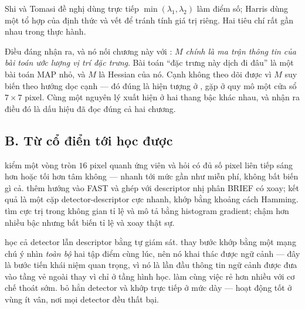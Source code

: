 \documentclass[../../vslam.tex]{subfiles}
\begin{document}
Shi và Tomasi \cite{shi1994good} đề nghị dùng trực tiếp \(\min(\lambda_1,\lambda_2)\) làm điểm số; Harris dùng một tổ hợp của định thức và vết để tránh tính giá trị riêng. Hai tiêu chí rất gần nhau trong thực hành.

Điều đáng nhận ra, và nó nối chương này với : \emph{\(M\) chính là ma trận thông tin của bài toán ước lượng vị trí đặc trưng}. Bài toán ``đặc trưng này dịch đi đâu'' là một bài toán MAP nhỏ, và \(M\) là Hessian của nó. Cạnh không theo dõi được vì \(M\) suy biến theo hướng dọc cạnh --- đó đúng là hiện tượng ở , gặp ở quy mô một cửa sổ \(7\times7\) pixel. Cùng một nguyên lý xuất hiện ở hai thang bậc khác nhau, và nhận ra điều đó là dấu hiệu đã đọc đúng cả hai chương.

\subsection{B. Từ cổ điển tới học được}

 \cite{rosten2006fast} kiểm một vòng tròn \(16\) pixel quanh ứng viên và hỏi có đủ số pixel liên tiếp sáng hơn hoặc tối hơn tâm không --- nhanh tới mức gần như miễn phí, không bất biến gì cả.  \cite{rublee2011orb} thêm hướng vào FAST và ghép với descriptor nhị phân BRIEF có xoay; kết quả là một cặp detector-descriptor cực nhanh, khớp bằng khoảng cách Hamming.  \cite{lowe2004sift} tìm cực trị trong không gian tỉ lệ và mô tả bằng histogram gradient; chậm hơn nhiều bậc nhưng bất biến tỉ lệ và xoay thật sự.

 \cite{detone2018superpoint} học cả detector lẫn descriptor bằng tự giám sát.  \cite{sarlin2020superglue} thay bước khớp bằng một mạng chú ý nhìn \emph{toàn bộ} hai tập điểm cùng lúc, nên nó khai thác được ngữ cảnh --- đây là bước tiến khái niệm quan trọng, vì nó là lần đầu thông tin ngữ cảnh được đưa vào tầng vẻ ngoài thay vì chỉ ở tầng hình học.  \cite{lindenberger2023lightglue} làm cùng việc rẻ hơn nhiều với cơ chế thoát sớm.  \cite{sun2021loftr} bỏ hẳn detector và khớp trực tiếp ở mức dày --- hoạt động tốt ở vùng ít vân, nơi mọi detector đều thất bại.
\end{document}
